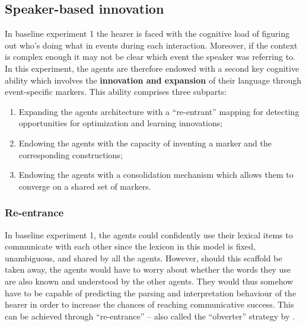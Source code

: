 \subsection{Speaker-based innovation}


In baseline experiment 1 the hearer is faced with the cognitive load of figuring out who's doing what in events during each interaction. Moreover, if the context is complex enough it may not be clear which event the speaker was referring to. In this experiment, the agents are therefore endowed with a second key cognitive ability which involves the {\bfseries innovation and expansion} of their language through event-specific markers. This ability comprises three subparts:

\begin{enumerate}
\item Expanding the agents architecture with a ``re-entrant'' mapping for detecting opportunities for optimization and learning innovations;
\item Endowing the agents with the capacity of inventing a marker and the corresponding constructions;
\item Endowing the agents with a consolidation mechanism which allows them to converge on a shared set of markers.  
\end{enumerate}

\subsubsection{Re-entrance}
 In baseline experiment 1, the agents could confidently use their lexical items to communicate with each other since the lexicon in this model is fixed, unambiguous, and shared by all the agents. However, should this scaffold be taken away, the agents would have to worry about whether the words they use are also known and understood by the other agents. They would thus somehow have to be capable of predicting the parsing and interpretation behaviour of the hearer in order to increase the chances of reaching communicative success. This can be achieved through ``re-entrance'' 
\citep{steels03language} -- also called the ``obverter'' strategy by \citet{smith03intelligent}.

